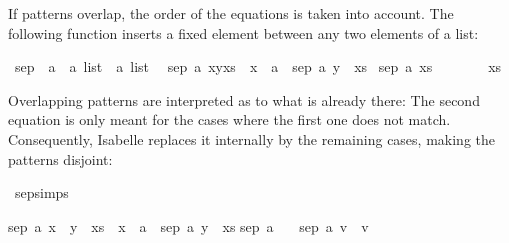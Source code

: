 \begin{isabellebody}
\begin{isamarkuptext}
  If patterns overlap, the order of the equations is taken into
  account. The following function inserts a fixed element between any
  two elements of a list:%
\end{isamarkuptext}%
\isamarkuptrue%
\isamarkupfalse%
\ sep\ {}{}\ {}{}a\ {}\ {}a\ list\ {}\ {}a\ list{}\isanewline
{}\isanewline
\ \ {}sep\ a\ {}x{}y{}xs{}\ {}\ x\ {}\ a\ {}\ sep\ a\ {}y\ {}\ xs{}{}\isanewline
{}\ {}sep\ a\ xs\ \ \ \ \ \ \ {}\ xs{}%
\begin{isamarkuptext}%
Overlapping patterns are interpreted as  to what is
  already there: The second equation is only meant for the cases where
  the first one does not match. Consequently, Isabelle replaces it
  internally by the remaining cases, making the patterns disjoint:%
\end{isamarkuptext}%
\isamarkuptrue%
\isamarkupfalse%
\ sep{}simps%
\begin{isamarkuptext}%
\begin{isabelle}%
sep\ a\ {}x\ {}\ y\ {}\ xs{}\ {}\ x\ {}\ a\ {}\ sep\ a\ {}y\ {}\ xs{}\isasep\isanewline%
sep\ a\ {}{}\ {}\ {}{}\isasep\isanewline%
sep\ a\ {}v{}\ {}\ {}v{}%

\end{isabelle}
\end{isamarkuptext}
\end{isabellebody}
